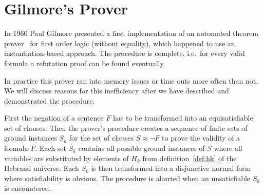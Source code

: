 
\section{Gilmore's Prover}\label{sec:gilmore:prover}

In 1960 Paul Gilmore presented a first {\myem{} implementation} of an automated
theorem prover~\cite{5392528} for first order logic (without equality),
which happened to use an instantiation-based approach.
The procedure is complete, i.e.~for every valid formula
a refutation proof can be found eventually.

In practice this prover ran into memory issues or time outs more often than not.
We will discuss reasons for this inefficiency after we have described and demonstrated the procedure.

First the negation of a sentence \(F\) has to be transformed into an equisatisfiable set of clauses.
Then the prover's procedure
creates a sequence of finite sets of ground instances \(S_k\)
for the set of clauses \(S\approx\lnot F\) to prove the validity of a formula \(F\).
Each set \(S_k\) contains all possible ground instances of \(S\)
where all variables are substituted by elements of \(H_k\)
from definition~\ref{def:hk} of the Hebrand universe.
Each \(S_k\) is then transformed into a disjunctive normal form where satisfiability is obvious.
The procedure is aborted when an unsatisfiable \(S_k\) is encountered.

